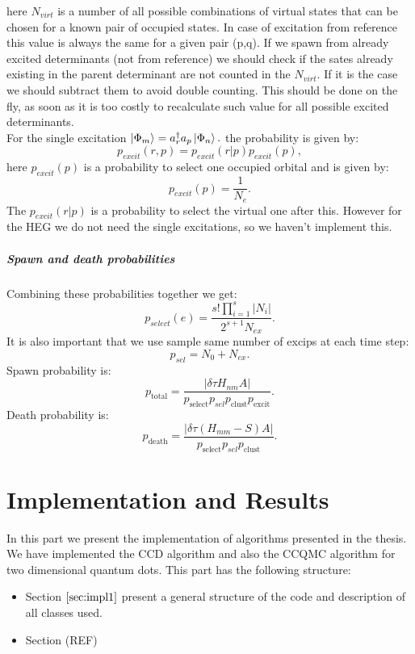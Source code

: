 \documentclass[twoside,english]{uiofysmaster}
\theoremstyle{definition}
\begin{document}
here $N_{virt}$ is a number of all possible combinations of virtual states that can be chosen for a known pair of occupied states. In case of excitation from reference this value is always the same for a given pair (p,q). If we spawn from already excited determinants (not from reference) we should check if the sates already existing in the parent determinant are not counted in the  $N_{virt}$. If it is the case we should subtract them to avoid double counting. This should be done on the fly, as soon as it is too costly to recalculate such value for all possible excited determinants.\\
For the single excitation $ \ket{\Phi_{m}}=a^\dagger_r a_p \ket{\Phi_n}.$  the probability is given by:
\begin{equation}
p_{excit}(r,p) = p_{excit}(r|p)p_{excit}(p),
\end{equation}
here $p_{excit}(p)$ is a probability to select one occupied orbital and is given by:
\begin{equation}
p_{excit}(p)=\frac{1}{N_e}.
\end{equation}
The $ p_{excit}(r|p)$ is a probability to select the virtual one after this. 
However for the HEG we do not need the single excitations, so we haven't implement this.

\subsubsection{Spawn and death probabilities}
Combining these probabilities together we get:
\begin{equation}
p_{select}(e)= \frac{s!\prod_{i=1}^{s} |N_i|}{2^{s+1}N_{ex}}.
\end{equation}
It is also important that we use sample same number of excips at each time step:
\begin{equation}
p_{sel}= N_0+N_{ex}.
\end{equation}
Spawn probability is:
\begin{equation}
p_{\text{total}} = \frac{|\delta \tau H_{nm}A|}{p_{\text{select}}p_{sel}p_{\text{clust}}p_{\text{excit}}}. 
\end{equation} 
Death probability is: 
\begin{equation}
p_{\text{death}} = \frac{|\delta \tau (H_{mm} - S)A|}{p_{\text{select}}p_{sel}p_{\text{clust}}}.
\end{equation}

\part{Implementation and Results}
In this part we present the implementation of algorithms presented in the thesis. We have implemented the CCD algorithm and also the CCQMC algorithm for two dimensional quantum dots. 
This part has the following structure:\\
\begin{itemize}
\item Section $\ref{sec:impl1}$ present a general structure of the code and description of all classes used.
\item Section (REF) 
\end{itemize}
\end{document}
